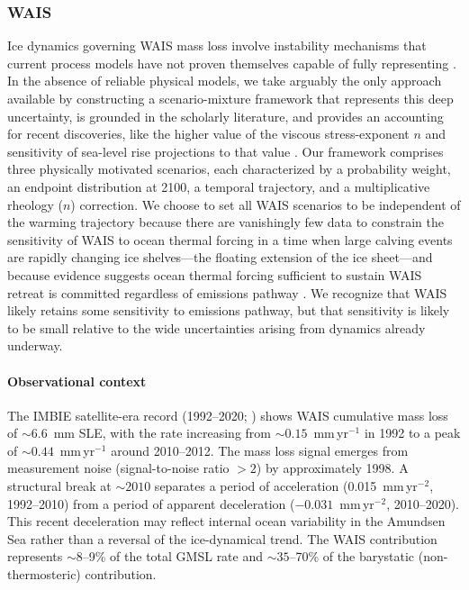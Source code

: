 \documentclass[12pt]{article}
\newcommand{\subsubsubsection}[1]{\paragraph{#1}\mbox{}\par}
\begin{document}
\subsubsection{WAIS}

Ice dynamics governing WAIS mass loss involve instability mechanisms that current process models have not proven themselves capable of fully representing \citep{Seroussi2020,Aschwanden2021}. In the absence of reliable physical models, we take arguably the only approach available by constructing a scenario-mixture framework that represents this deep uncertainty, is grounded in the scholarly literature, and provides an accounting for recent discoveries, like the higher value of the viscous stress-exponent $n$ \citep{Millstein2022,Ranganathan2024} and sensitivity of sea-level rise projections to that value \citep{GetraerMorlighem2025, Martin2026}. Our framework comprises three physically motivated scenarios, each characterized by a probability weight, an endpoint distribution at 2100, a temporal trajectory, and a multiplicative rheology ($n$) correction. We choose to set all WAIS scenarios to be independent of the warming trajectory because there are vanishingly few data to constrain the sensitivity of WAIS to ocean thermal forcing in a time when large calving events are rapidly changing ice shelves---the floating extension of the ice sheet---and because evidence suggests ocean thermal forcing sufficient to sustain WAIS retreat is committed regardless of emissions pathway \citep{Naughten2023}. We recognize that WAIS likely retains some sensitivity to emissions pathway, but that sensitivity is likely to be small relative to the wide uncertainties arising from dynamics already underway. 

\subsubsubsection{Observational context}

The IMBIE satellite-era record (1992--2020; \cite{Otosaka2023}) shows WAIS cumulative mass loss of ${\sim}6.6$~mm SLE, with the rate increasing from ${\sim}0.15$~mm\,yr$^{-1}$ in 1992 to a peak of ${\sim}0.44$~mm\,yr$^{-1}$ around 2010--2012. The mass loss signal emerges from measurement noise (signal-to-noise ratio $> 2$) by approximately 1998. A structural break at ${\sim}2010$ separates a period of acceleration (0.015~mm\,yr$^{-2}$, 1992--2010) from a period of apparent deceleration ($-0.031$~mm\,yr$^{-2}$, 2010--2020). This recent deceleration may reflect internal ocean variability in the Amundsen Sea \citep{Jenkins2018} rather than a reversal of the ice-dynamical trend. The WAIS contribution represents ${\sim}8$--9\% of the total GMSL rate and ${\sim}35$--70\% of the barystatic (non-thermosteric) contribution.
\end{document}
